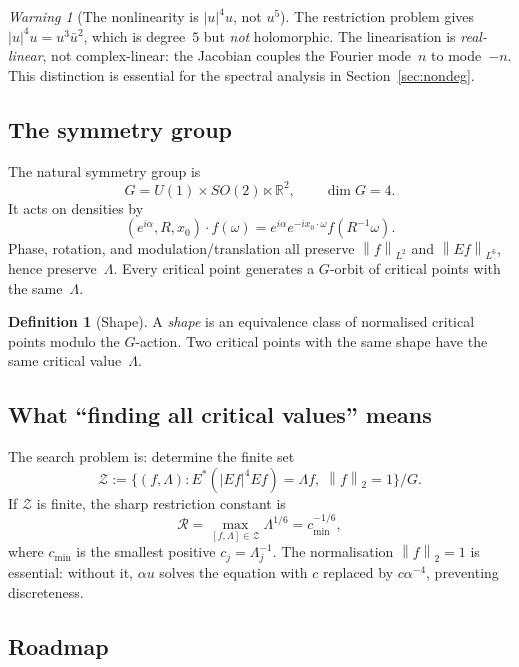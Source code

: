 \documentclass[12pt]{article}
\theoremstyle{definition}
\newtheorem{definition}[theorem]{Definition}
\theoremstyle{remark}
\newtheorem{warning}[theorem]{Warning}
\newcommand{\R}{\mathbb{R}}
\newcommand{\norm}[1]{\left\|#1\right\|}
\begin{document}
\begin{warning}[The nonlinearity is $|u|^4u$, not $u^5$]
  The restriction problem gives $|u|^4u=u^3\bar u^2$, which is
  degree~$5$ but \emph{not} holomorphic.  The linearisation is
  \emph{real-linear}, not complex-linear: the Jacobian couples the Fourier
  mode~$n$ to mode~$-n$.  This distinction is essential for the spectral
  analysis in Section~\ref{sec:nondeg}.
\end{warning}

\subsection{The symmetry group}

The natural symmetry group is
\[
  G = U(1)\times SO(2)\ltimes\R^2,
  \qquad \dim G=4.
\]
It acts on densities by
\[
  (e^{i\alpha},R,x_0)\cdot f(\omega)
  = e^{i\alpha}e^{-ix_0\cdot\omega}f(R^{-1}\omega).
\]
Phase, rotation, and modulation/translation all preserve $\norm{f}_{L^2}$
and $\norm{Ef}_{L^6}$, hence preserve~$\Lambda$.  Every critical point
generates a $G$-orbit of critical points with the same~$\Lambda$.

\begin{definition}[Shape]
  A \emph{shape} is an equivalence class of normalised critical points modulo
  the $G$-action.  Two critical points with the same shape have the same
  critical value~$\Lambda$.
\end{definition}

\subsection{What ``finding all critical values'' means}

The search problem is: determine the finite set
\[
  \mathcal Z
  :=
  \{(f,\Lambda):E^*(|Ef|^4Ef)=\Lambda f,\;\norm{f}_2=1\}/G.
\]
If $\mathcal Z$ is finite, the sharp restriction constant is
\[
  \mathcal R = \max_{[f,\Lambda]\in\mathcal Z}\Lambda^{1/6}
  = c_{\min}^{-1/6},
\]
where $c_{\min}$ is the smallest positive $c_j=\Lambda_j^{-1}$.
The normalisation $\norm{f}_2=1$ is essential: without it, $\alpha u$ solves
the equation with $c$ replaced by $c\alpha^{-4}$, preventing discreteness.



\subsection{Roadmap}
\end{document}
